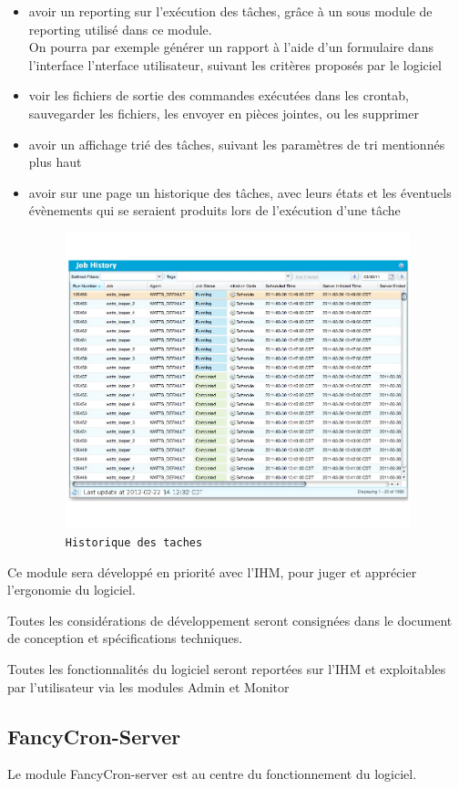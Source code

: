 \documentclass{bouygues-fr}
\begin{document}
\begin{itemize}
\item avoir un reporting sur l'exécution des tâches, grâce à un sous module de reporting utilisé dans ce module.\\
On pourra par exemple générer un rapport à l'aide d'un formulaire dans l'interface l'nterface utilisateur, suivant les critères proposés par le logiciel
\item voir les fichiers de sortie des commandes exécutées dans les crontab, sauvegarder les fichiers, les envoyer en pièces jointes, ou les supprimer
\item avoir un affichage trié des tâches, suivant les paramètres de tri mentionnés plus haut
\item avoir sur une page un historique des tâches, avec leurs états et les éventuels évènements qui se seraient produits lors de l'exécution d'une tâche
 \begin{figure}[H]
    \begin{center}
      \includegraphics[width=10cm]{history.png}
    \end{center}
    \caption{\scriptsize \texttt{Historique des taches}}
  \end{figure}

\end{itemize}
Ce module sera développé en priorité avec l'IHM, pour juger et apprécier l'ergonomie du logiciel.

Toutes les considérations de développement seront consignées dans le document de conception et spécifications techniques.

Toutes les fonctionnalités du logiciel seront reportées sur l'IHM et exploitables par l'utilisateur via les modules Admin et Monitor

\subsection{FancyCron-Server}
Le module FancyCron-server  est au centre du fonctionnement du logiciel.
\end{document}
